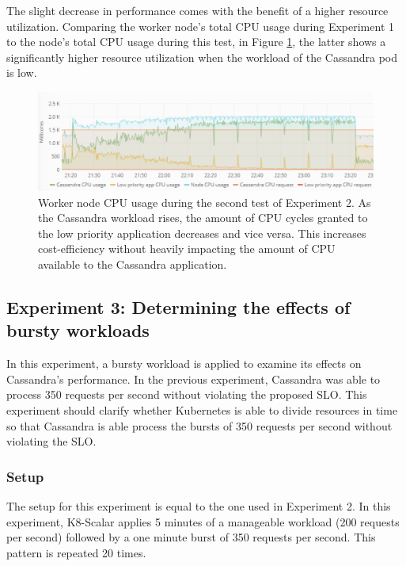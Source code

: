 The slight decrease in performance comes with the benefit of a higher resource utilization. Comparing the worker node's total CPU usage during Experiment 1 to the node's total CPU usage during this test, in Figure \ref{fig:cpu-cas-lpp-li-2}, the latter shows a significantly higher resource utilization when the workload of the Cassandra pod is low.

\begin{figure}
\centering
\includegraphics[width=\columnwidth]{Images/Experiments/CPU/Grafana/cpu-cas-lpp-li-2.PNG}
\caption{Worker node CPU usage during the second test of Experiment 2. As the Cassandra workload rises, the amount of CPU cycles granted to the low priority application decreases and vice versa. This increases cost-efficiency without heavily impacting the amount of CPU available to the Cassandra application.}
\label{fig:cpu-cas-lpp-li-2}
\end{figure}

\subsection{Experiment 3: Determining the effects of bursty workloads}
In this experiment, a bursty workload is applied to examine its effects on Cassandra's performance. In the previous experiment, Cassandra was able to process 350 requests per second without violating the proposed SLO. This experiment should clarify whether Kubernetes is able to divide resources in time so that Cassandra is able process the bursts of 350 requests per second without violating the SLO.

\subsubsection{Setup}
The setup for this experiment is equal to the one used in Experiment 2. In this experiment, K8-Scalar applies 5 minutes of a manageable workload (200 requests per second) followed by a one minute burst of 350 requests per second. This pattern is repeated 20 times.  

